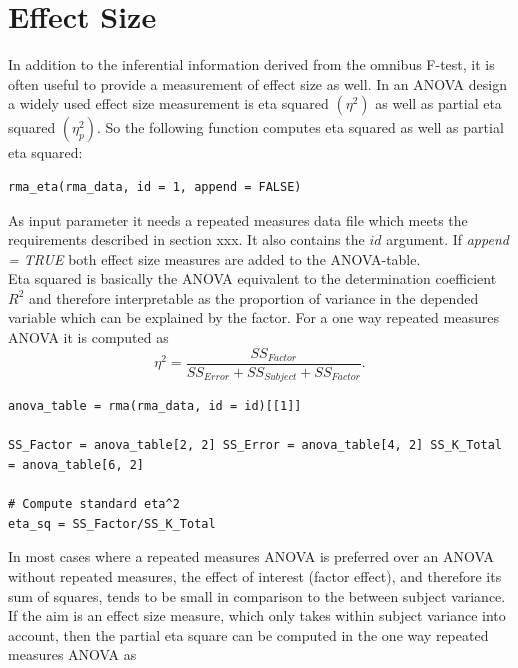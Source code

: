 \documentclass[11pt]{article}
\begin{document}
	
	\section{Effect Size} 
		In addition to the inferential information derived from the omnibus F-test, it is often useful to provide a measurement of effect size as well. In an ANOVA design a widely used effect size measurement is eta squared $(\eta^2)$ as well as partial eta squared $(\eta^2_p)$. So the following function computes eta squared as well as partial eta squared:\\
		
		\begin{lstlisting}
rma_eta(rma_data, id = 1, append = FALSE)
		\end{lstlisting}
		
		As input parameter it needs a repeated measures data file which meets the requirements described in section xxx. It also contains the $id$ argument. If \textit{append = TRUE} both effect size measures are added to the ANOVA-table.\\
		
		Eta squared is basically the ANOVA equivalent to the determination coefficient $R^2$ and therefore interpretable as the proportion of variance in the depended variable which can be explained by the factor. For a one way repeated measures ANOVA it is computed as\\
		
		\begin{equation}
		\eta^2 = \frac{SS_{Factor}}{SS_{Error} + SS_{Subject} + SS_{Factor}}.
		\end{equation}
		
		\vspace{8 mm}
		
		\begin{lstlisting}
anova_table = rma(rma_data, id = id)[[1]]
		
SS_Factor = anova_table[2, 2] SS_Error = anova_table[4, 2] SS_K_Total = anova_table[6, 2]
		
# Compute standard eta^2
eta_sq = SS_Factor/SS_K_Total
		\end{lstlisting}
		
		In most cases where a repeated measures ANOVA is preferred over an ANOVA without repeated measures, the effect of interest (factor effect), and therefore its sum of squares, tends to be small in comparison to the between subject variance. If the aim is an effect size measure, which only takes within subject variance into account, then the partial eta square can be computed in the one way repeated measures ANOVA as\\
		
\end{document}
